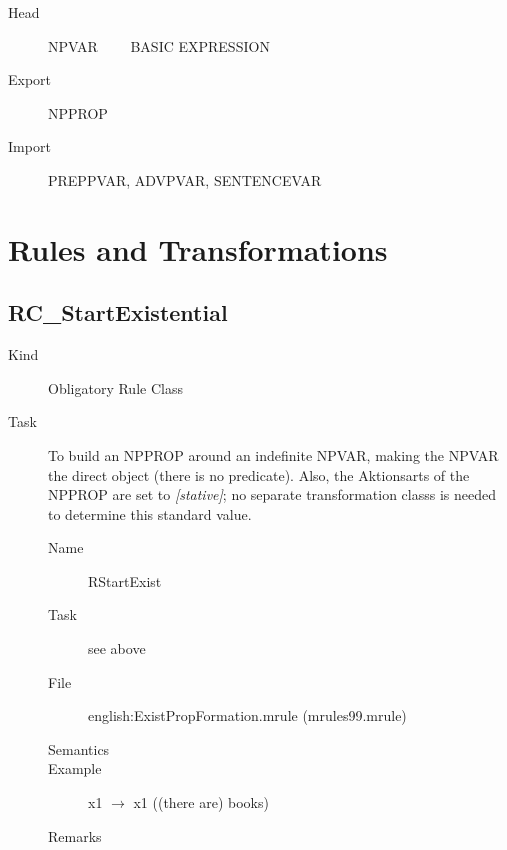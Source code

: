 \begin{description}
  \item[Head]  NPVAR \ \ \ \ BASIC EXPRESSION
  \item[Export] NPPROP
  \item[Import] PREPPVAR, ADVPVAR, SENTENCEVAR
\end{description}

\newpage
\section{Rules and Transformations}

\subsection{RC\_StartExistential}
\begin{description}
\item[Kind] Obligatory Rule Class
\item[Task] To build an NPPROP around an indefinite NPVAR, making the NPVAR the 
direct object (there is no predicate). Also, the Aktionsarts of the NPPROP are 
set to {\em [stative]\/}; no separate transformation classs is needed to 
determine this standard value.

\vspace{1 cm}
\begin{description}
\item[Name] RStartExist
\item[Task] see above
\item[File] english:ExistPropFormation.mrule (mrules99.mrule)
\item[Semantics]
\item[Example] x1 $\rightarrow$ x1 ((there are) books)
\item[Remarks]
\end{description}

\end{description}

\newpage
